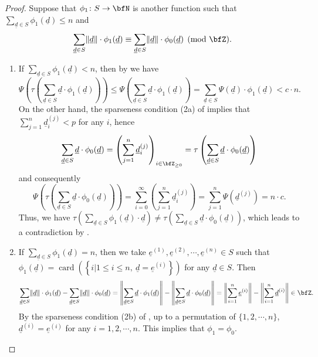 \documentclass[english,oneside]{smfart}
\newcommand{\opn}[1]{\operatorname{#1}}
\newcommand{\uld}{\underline{d}}
\newcommand{\normd}{\lVert\uld\rVert}
\begin{document}
\begin{proof}
    Suppose that $\phi_1\colon S\to\bfN$ is another function such that $\sum_{\uld\in S}\phi_1(\uld)\leq n$ and
    $$\sum_{\uld\in S}\normd\cdot\phi_1(\uld)\equiv \sum_{\uld\in S}\normd\cdot\phi_0(\uld)\pmod{\bfZ}.$$
    \begin{enumerate}
        \item If $\sum_{\uld\in S}\phi_1(\uld)< n$, then by  we have
              $$\Psi\left(\tau\left(\sum_{\uld\in S}\uld\cdot\phi_1(\uld)\right)\right)\leq\Psi\left(\sum_{\uld\in S}\uld\cdot\phi_1(\uld)\right)=\sum_{\uld\in S}\Psi(\uld)\cdot\phi_1(\uld)<c\cdot n.$$
              On the other hand, the sparseness condition (2a) of  implies that $\sum_{j=1}^n\uld_i^{(j)}<p$ for any $i$, hence
              $$\sum_{\uld\in S}\uld\cdot\phi_0(\uld)=\left(\sum_{j=1}^n\uld_i^{(j)}\right)_{i\in\bfZ_{\geq 0}}=\tau\left(\sum_{\uld\in S}\uld\cdot\phi_0(\uld)\right)$$
              and consequently
              $$\Psi\left(\tau\left(\sum_{\uld\in S}\uld\cdot\phi_0(\uld)\right)\right)=\sum_{i=0}^\infty \left(\sum_{j=1}^n\uld_i^{(j)}\right)=\sum_{j=1}^n \Psi(\uld^{(j)})=n\cdot c.$$
              Thus, we have $\tau\left(\sum_{\uld\in S}\phi_1(\uld)\cdot\uld\right)\neq \tau\left(\sum_{\uld\in S}\uld\cdot\phi_0(\uld)\right)$, which leads to a contradiction by .
        \item If $\sum_{\uld\in S}\phi_1(\uld)= n$, then we take $\underline{e}^{(1)}, \underline{e}^{(2)}, \cdots, \underline{e}^{(n)}\in S$ such that $\phi_1(\uld)=\opn{card}\left(\left\{i\vert 1\leq i\leq n,\ \uld=\underline{e}^{(i)}\right\}\right)$ for any $\uld\in S$. Then
              $$\sum_{\uld\in S}\normd\cdot\phi_1(\uld)-\sum_{\uld\in S}\normd\cdot\phi_0(\uld)=\left\lVert\sum_{\uld\in S}\uld\cdot\phi_1(\uld)\right\rVert-\left\lVert\sum_{\uld\in S}\uld\cdot\phi_0(\uld)\right\rVert=\left\lVert\sum_{i=1}^n\underline{e}^{(i)}\right\rVert-\left\lVert\sum_{i=1}^n\uld^{(i)}\right\rVert\in\bfZ.$$
              By the sparseness condition (2b) of , up to a permutation of $\{1,2,\cdots,n\}$, $\uld^{(i)}=\underline{e}^{(i)}$ for any $i=1,2,\cdots,n$. This implies that $\phi_1=\phi_0$.
    \end{enumerate}
\end{proof}
\iffalse
\end{document}
